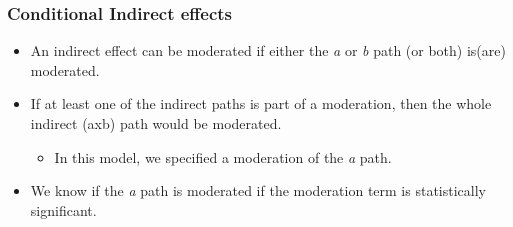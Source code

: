 \documentclass[
  11pt,
]{book}
\providecommand{\tightlist}{%
  \setlength{\itemsep}{0pt}\setlength{\parskip}{0pt}}
\begin{document}
\hypertarget{conditional-indirect-effects}{%
\subsubsection{Conditional Indirect effects}\label{conditional-indirect-effects}}

\begin{itemize}
\tightlist
\item
  An indirect effect can be moderated if either the \emph{a} or \emph{b} path (or both) is(are) moderated.
\item
  If at least one of the indirect paths is part of a moderation, then the whole indirect (axb) path would be moderated.

  \begin{itemize}
  \tightlist
  \item
    In this model, we specified a moderation of the \emph{a} path.
  \end{itemize}
\item
  We know if the \emph{a} path is moderated if the moderation term is statistically significant.


\end{itemize}
\end{document}
